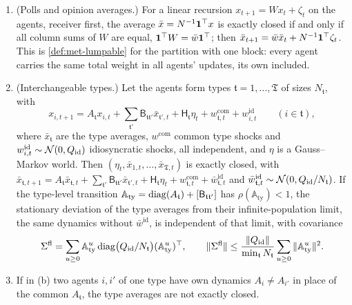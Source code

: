 \begin{proposition}\label{prop:env-aggregate-closure}
\begin{enumerate}
\item[(a)] (Polls and opinion averages.) For a linear recursion $x_{t+1}=Wx_t+\zeta_t$ on the agents, receiver first, the average $\bar x=N^{-1}\mathbf{1}^\top x$ is exactly closed if and only if all column sums of $W$ are equal, $\mathbf{1}^\top W=\bar w\mathbf{1}^\top$; then $\bar x_{t+1}=\bar w\bar x_t+N^{-1}\mathbf{1}^\top\zeta_t$. This is \cref{def:met-lumpable} for the partition with one block: every agent carries the same total weight in all agents' updates, its own included.
\item[(b)] (Interchangeable types.) Let the agents form types $\mathfrak t=1,\dots,\mathfrak T$ of sizes $N_{\mathfrak t}$, with
\[
x_{i,t+1}=A_{\mathfrak t}x_{i,t}+\sum_{\mathfrak t'}\mathsf B_{\mathfrak t\mathfrak t'}\bar x_{\mathfrak t',t}+\mathsf H_{\mathfrak t}\eta_t+w^{\mathrm{com}}_{\mathfrak t,t}+w^{\mathrm{id}}_{i,t}\qquad(i\in\mathfrak t),
\]
where $\bar x_{\mathfrak t}$ are the type averages, $w^{\mathrm{com}}$ common type shocks and $w^{\mathrm{id}}_{i,t}\sim\mathcal{N}(0,Q_{\mathrm{id}})$ idiosyncratic shocks, all independent, and $\eta$ is a Gauss--Markov world. Then $(\eta_t,\bar x_{1,t},\dots,\bar x_{\mathfrak T,t})$ is exactly closed, with $\bar x_{\mathfrak t,t+1}=A_{\mathfrak t}\bar x_{\mathfrak t,t}+\sum_{\mathfrak t'}\mathsf B_{\mathfrak t\mathfrak t'}\bar x_{\mathfrak t',t}+\mathsf H_{\mathfrak t}\eta_t+w^{\mathrm{com}}_{\mathfrak t,t}+\bar w^{\mathrm{id}}_{\mathfrak t,t}$ and $\bar w^{\mathrm{id}}_{\mathfrak t,t}\sim\mathcal{N}(0,Q_{\mathrm{id}}/N_{\mathfrak t})$. If the type-level transition $\mathbb A_{\mathrm{ty}}=\operatorname{diag}(A_{\mathfrak t})+[\mathsf B_{\mathfrak t\mathfrak t'}]$ has $\rho(\mathbb A_{\mathrm{ty}})<1$, the stationary deviation of the type averages from their infinite-population limit, the same dynamics without $\bar w^{\mathrm{id}}$, is independent of that limit, with covariance
\[
\Sigma^{\mathrm{fl}}=\sum_{u\ge0}\mathbb A_{\mathrm{ty}}^u\operatorname{diag}\bigl(Q_{\mathrm{id}}/N_{\mathfrak t}\bigr)(\mathbb A_{\mathrm{ty}}^u)^\top,\qquad\Vert\Sigma^{\mathrm{fl}}\Vert\le\frac{\Vert Q_{\mathrm{id}}\Vert}{\min_{\mathfrak t}N_{\mathfrak t}}\sum_{u\ge0}\Vert\mathbb A_{\mathrm{ty}}^u\Vert^2.
\]
\item[(c)] If in (b) two agents $i,i'$ of one type have own dynamics $A_i\ne A_{i'}$ in place of the common $A_{\mathfrak t}$, the type averages are not exactly closed.
\end{enumerate}
\end{proposition}


